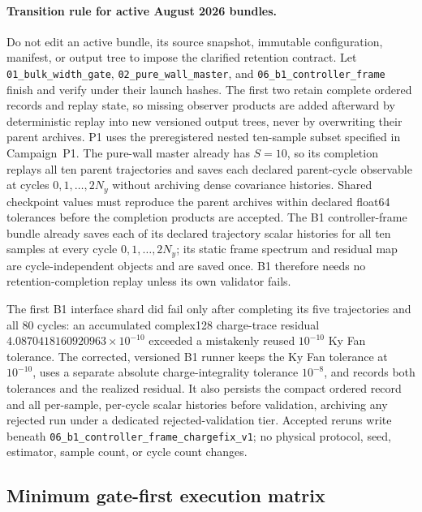 \documentclass[aps,prx,twocolumn,floatfix,nofootinbib,superscriptaddress,longbibliography]{revtex4-2}
\newcommand{\code}[1]{\texttt{#1}}
\begin{document}
\paragraph*{Transition rule for active August 2026 bundles.}
Do not edit an active bundle, its source snapshot, immutable configuration, manifest, or
output tree to impose the clarified retention contract.  Let
\code{01\_bulk\_width\_gate}, \code{02\_pure\_wall\_master}, and
\code{06\_b1\_controller\_frame} finish and verify under their launch hashes.  The first
two retain complete ordered records and replay state, so missing observer products are
added afterward by deterministic replay into new versioned output trees, never by
overwriting their parent archives.  P1 uses the preregistered nested ten-sample subset
specified in Campaign~P1.  The pure-wall master already has $S=10$, so its completion
replays all ten parent trajectories and saves each declared parent-cycle observable at
cycles $0,1,\ldots,2N_y$ without archiving dense covariance histories.  Shared checkpoint
values must reproduce the parent archives within declared float64 tolerances before the
completion products are accepted.  The B1 controller-frame bundle already saves each of
its declared trajectory scalar histories for all ten samples at every cycle
$0,1,\ldots,2N_y$; its static frame spectrum and residual map are cycle-independent
objects and are saved once.  B1 therefore needs no retention-completion replay unless its
own validator fails.

The first B1 interface shard did fail only after completing its five trajectories and all
$80$ cycles: an accumulated complex128 charge-trace residual
$4.0870418160920963\times10^{-10}$ exceeded a mistakenly reused $10^{-10}$ Ky Fan
tolerance.  The corrected, versioned B1 runner keeps the Ky Fan tolerance at $10^{-10}$,
uses a separate absolute charge-integrality tolerance $10^{-8}$, and records both
tolerances and the realized residual.  It also persists the compact ordered record and
all per-sample, per-cycle scalar histories before validation, archiving any rejected run
under a dedicated rejected-validation tier.  Accepted reruns write beneath
\code{06\_b1\_controller\_frame\_chargefix\_v1}; no physical protocol, seed, estimator,
sample count, or cycle count changes.

\subsection{Minimum gate-first execution matrix}
\end{document}
